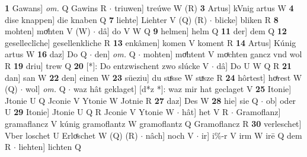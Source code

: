 \documentclass[8pt,a4paper,notitlepage]{article}
\begin{document}
\begin{table}[ht]
\begin{minipage}[t]{0.5\linewidth}
\textbf{1} Gawans] \textit{om.} Q Gawins R  $\cdot$ triuwen] treúwe W (R) \textbf{3} Artus] kVnig artus W \textbf{4} dise knappen] die knaben Q \textbf{7} liehte] Liehter V (Q) (R)  $\cdot$ blicke] bliken R \textbf{8} mohten] moͤhten V (W)  $\cdot$ dâ] do V W Q \textbf{9} helmen] helm Q \textbf{11} der] dem Q \textbf{12} geselleclîche] gesellenkliche R \textbf{13} enkâmen] komen V koment R \textbf{14} Artus] Kúnig artus W \textbf{16} daz] Do Q  $\cdot$ den] \textit{om.} Q  $\cdot$ mohten] moͤhtent V moͯchten gancz vnd wol R \textbf{19} driu] trew Q \textbf{20} [*]: Do entzwischent zwo slúcke V  $\cdot$ dâ] Do U W Q R \textbf{21} dan] san W \textbf{22} den] einen W \textbf{23} süeziu] du suͤsse W suͯsze R \textbf{24} hôrtest] hoͤrest W (Q)  $\cdot$ wol] \textit{om.} Q  $\cdot$ waz hât geklaget] [d*z *]: waz mir hat geclaget V \textbf{25} Itonie] Jtonie U Q Jconie V Ytonie W Jotnie R \textbf{27} daz] Des W \textbf{28} hie] sie Q  $\cdot$ ob] oder U \textbf{29} Itonie] Jtonie U Q R Jconie V Ytonie W  $\cdot$ hât] het V R  $\cdot$ Gramoflanz] gramaflancz V kúnig gramoflantz W gramoflantz Q Gramoflancz R \textbf{30} verleschet] Vber loschet U Erloͤschet W (Q) (R)  $\cdot$ nâch] noch V  $\cdot$ ir] i\%-r V irm W irē Q dem R  $\cdot$ liehten] lichten Q \newline
\end{minipage}
\end{table}
\end{document}
